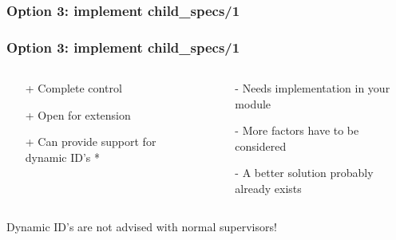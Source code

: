 \begin{frame}
    \frametitle{Option 3: implement child\_specs/1}
\end{frame}

\begin{frame}
    \frametitle{Option 3: implement child\_specs/1}
    \begin{columns}

        \begin{column}{0.5\textwidth}
            \begin{itemize}
                \item[+] Complete control
                \item[+] Open for extension
                \item[+] Can provide support for dynamic ID's *
            \end{itemize}
        \end{column}

        \begin{column}{0.5\textwidth}
            \begin{itemize}
                \item[-] Needs implementation in your module
                \item[-] More factors have to be considered
                \item[-] A better solution probably already exists
            \end{itemize}
        \end{column}
    \end{columns}
    \vfill
    \footnotesize * Dynamic ID's are not advised with normal supervisors!
\end{frame}